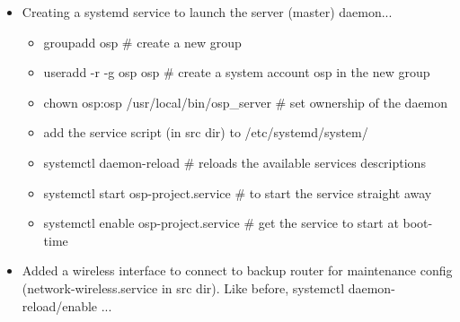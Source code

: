 \begin{itemize}
  \item Creating a systemd service to launch the server (master) daemon...
    \begin{itemize}
      \item groupadd osp \# create a new group
      \item useradd -r -g osp osp \# create a system account osp in the new group
      \item chown osp:osp /usr/local/bin/osp\_server \# set ownership of the daemon
      \item add the service script (in src dir) to /etc/systemd/system/
      \item systemctl daemon-reload \# reloads the available services descriptions
      \item systemctl start osp-project.service \# to start the service straight away
      \item systemctl enable osp-project.service \# get the service to start at boot-time
    \end{itemize}
  \item Added a wireless interface to connect to backup router for maintenance config (network-wireless.service in src dir). Like before, systemctl daemon-reload/enable ...

\end{itemize}

